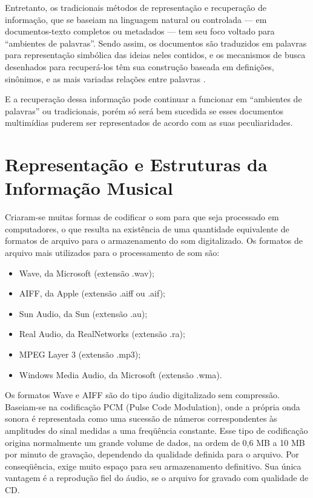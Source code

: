 Entretanto, os tradicionais métodos de representação e recuperação de informação, que se baseiam na linguagem natural ou controlada — em documentos-texto completos ou metadados — tem seu foco voltado para “ambientes de palavras”. Sendo assim, os documentos são traduzidos em palavras para representação simbólica das ideias neles contidos, e os mecanismos de busca desenhados para recuperá-los têm sua construção baseada em definições, sinônimos, e as mais variadas relações entre palavras \cite{lima&santini2006}.

E a recuperação dessa informação pode continuar a funcionar em “ambientes de palavras” ou tradicionais, porém só será bem sucedida se esses documentos multimídias puderem ser representados de acordo com as suas peculiaridades.

\section{Representação e Estruturas da Informação Musical}

Criaram-se muitas formas de codificar o som para que seja processado em computadores, o que resulta na existência de uma quantidade equivalente de formatos de arquivo para o armazenamento do som digitalizado. Os formatos de arquivo mais utilizados para o processamento de som são:

\begin{itemize}
   \item Wave, da Microsoft (extensão .wav);
   \item AIFF, da Apple (extensão .aiff ou .aif);
   \item Sun Audio, da Sun (extensão .au);
   \item Real Audio, da RealNetworks (extensão .ra);
   \item MPEG Layer 3 (extensão .mp3);
   \item Windows Media Audio, da Microsoft (extensão .wma).
 \end{itemize}
 
 Os formatos Wave e AIFF são do tipo áudio digitalizado sem compressão. Baseiam-se na codificação PCM (Pulse Code Modulation), onde a própria onda sonora é representada como uma sucessão de números correspondentes às amplitudes do sinal medidas a uma freqüência constante. Esse tipo de codificação origina normalmente um grande volume de dados, na ordem de 0,6 MB a 10 MB por minuto de gravação, dependendo da qualidade definida para o arquivo. Por conseqüência, exige muito espaço para seu armazenamento definitivo. Sua única vantagem é a reprodução fiel do áudio, se o arquivo for gravado com qualidade de CD.

